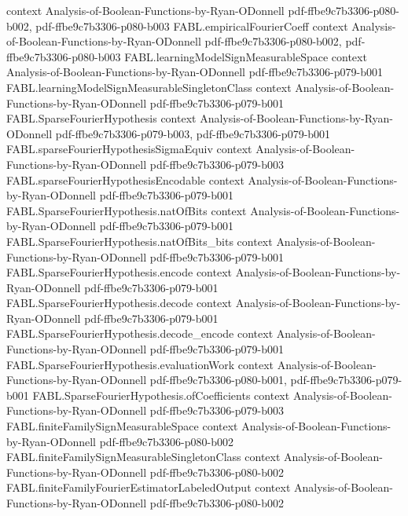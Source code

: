 \begin{theorem}
  {context}
  {Analysis-of-Boolean-Functions-by-Ryan-ODonnell}
  {pdf-ffbe9c7b3306-p080-b002,
    pdf-ffbe9c7b3306-p080-b003}
\proofstep
  {FABL.empiricalFourierCoeff}
  {context}
  {Analysis-of-Boolean-Functions-by-Ryan-ODonnell}
  {pdf-ffbe9c7b3306-p080-b002,
    pdf-ffbe9c7b3306-p080-b003}
\proofstep
  {FABL.learningModelSignMeasurableSpace}
  {context}
  {Analysis-of-Boolean-Functions-by-Ryan-ODonnell}
  {pdf-ffbe9c7b3306-p079-b001}
\proofstep
  {FABL.learningModelSignMeasurableSingletonClass}
  {context}
  {Analysis-of-Boolean-Functions-by-Ryan-ODonnell}
  {pdf-ffbe9c7b3306-p079-b001}
\proofstep
  {FABL.SparseFourierHypothesis}
  {context}
  {Analysis-of-Boolean-Functions-by-Ryan-ODonnell}
  {pdf-ffbe9c7b3306-p079-b003,
    pdf-ffbe9c7b3306-p079-b001}
\proofstep
  {FABL.sparseFourierHypothesisSigmaEquiv}
  {context}
  {Analysis-of-Boolean-Functions-by-Ryan-ODonnell}
  {pdf-ffbe9c7b3306-p079-b003}
\proofstep
  {FABL.sparseFourierHypothesisEncodable}
  {context}
  {Analysis-of-Boolean-Functions-by-Ryan-ODonnell}
  {pdf-ffbe9c7b3306-p079-b001}
\proofstep
  {FABL.SparseFourierHypothesis.natOfBits}
  {context}
  {Analysis-of-Boolean-Functions-by-Ryan-ODonnell}
  {pdf-ffbe9c7b3306-p079-b001}
\proofstep
  {FABL.SparseFourierHypothesis.natOfBits_bits}
  {context}
  {Analysis-of-Boolean-Functions-by-Ryan-ODonnell}
  {pdf-ffbe9c7b3306-p079-b001}
\proofstep
  {FABL.SparseFourierHypothesis.encode}
  {context}
  {Analysis-of-Boolean-Functions-by-Ryan-ODonnell}
  {pdf-ffbe9c7b3306-p079-b001}
\proofstep
  {FABL.SparseFourierHypothesis.decode}
  {context}
  {Analysis-of-Boolean-Functions-by-Ryan-ODonnell}
  {pdf-ffbe9c7b3306-p079-b001}
\proofstep
  {FABL.SparseFourierHypothesis.decode_encode}
  {context}
  {Analysis-of-Boolean-Functions-by-Ryan-ODonnell}
  {pdf-ffbe9c7b3306-p079-b001}
\proofstep
  {FABL.SparseFourierHypothesis.evaluationWork}
  {context}
  {Analysis-of-Boolean-Functions-by-Ryan-ODonnell}
  {pdf-ffbe9c7b3306-p080-b001,
    pdf-ffbe9c7b3306-p079-b001}
\proofstep
  {FABL.SparseFourierHypothesis.ofCoefficients}
  {context}
  {Analysis-of-Boolean-Functions-by-Ryan-ODonnell}
  {pdf-ffbe9c7b3306-p079-b003}
\proofstep
  {FABL.finiteFamilySignMeasurableSpace}
  {context}
  {Analysis-of-Boolean-Functions-by-Ryan-ODonnell}
  {pdf-ffbe9c7b3306-p080-b002}
\proofstep
  {FABL.finiteFamilySignMeasurableSingletonClass}
  {context}
  {Analysis-of-Boolean-Functions-by-Ryan-ODonnell}
  {pdf-ffbe9c7b3306-p080-b002}
\proofstep
  {FABL.finiteFamilyFourierEstimatorLabeledOutput}
  {context}
  {Analysis-of-Boolean-Functions-by-Ryan-ODonnell}
  {pdf-ffbe9c7b3306-p080-b002}

\end{theorem}
